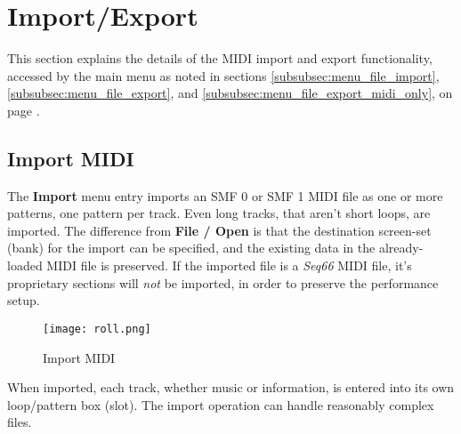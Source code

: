 %
%
%

\section{Import/Export}
\label{sec:midi_export}

   This section explains the details of the MIDI import and export
   functionality, accessed by the main menu as noted in
   sections
   \ref{subsubsec:menu_file_import},
   \ref{subsubsec:menu_file_export}, and
   \ref{subsubsec:menu_file_export_midi_only}, on page
   \pageref{subsubsec:menu_file_import}.


\subsection{Import MIDI}
\label{subsec:midi_export_file_import}

   The \textbf{Import} menu entry imports an SMF 0
   or SMF 1 MIDI file as one or more patterns, one pattern per track.
   Even long tracks, that aren't short loops, are imported.
   The difference from \textbf{File / Open} is that the destination screen-set
   (bank) for the import can be specified, and the existing data in the
   already-loaded MIDI file is preserved.
   If the imported file is a
   \textsl{Seq66} MIDI file, it's proprietary sections will
   \textsl{not} be imported, in order to preserve the performance setup.

\begin{figure}[H]
   \centering 
   \texttt{[image: roll.png]}
   \caption{Import MIDI}
   \label{fig:midi_export_file_import}
\end{figure}

   When imported, each track, whether music or information,
   is entered into its own loop/pattern box (slot).
   The import operation can handle reasonably complex files.

